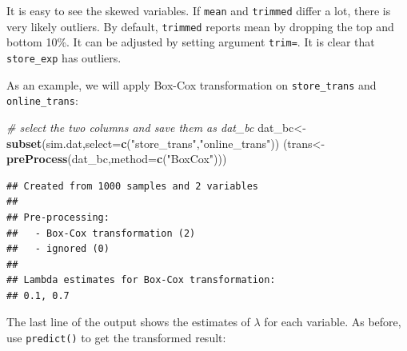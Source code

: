 \documentclass[12pt,]{krantz}
\newenvironment{Shaded}{\begin{snugshade}}{\end{snugshade}}
\newcommand{\KeywordTok}[1]{\textcolor[rgb]{0.13,0.29,0.53}{\textbf{#1}}}
\newcommand{\DataTypeTok}[1]{\textcolor[rgb]{0.13,0.29,0.53}{#1}}
\newcommand{\DecValTok}[1]{\textcolor[rgb]{0.00,0.00,0.81}{#1}}
\newcommand{\StringTok}[1]{\textcolor[rgb]{0.31,0.60,0.02}{#1}}
\newcommand{\CommentTok}[1]{\textcolor[rgb]{0.56,0.35,0.01}{\textit{#1}}}
\newcommand{\OperatorTok}[1]{\textcolor[rgb]{0.81,0.36,0.00}{\textbf{#1}}}
\newcommand{\NormalTok}[1]{#1}
\theoremstyle{definition}
\theoremstyle{definition}
\theoremstyle{definition}
\theoremstyle{remark}
\begin{document}
It is easy to see the skewed variables. If \texttt{mean} and
\texttt{trimmed} differ a lot, there is very likely outliers. By
default, \texttt{trimmed} reports mean by dropping the top and bottom
10\%. It can be adjusted by setting argument \texttt{trim=}. It is clear
that \texttt{store\_exp} has outliers.

As an example, we will apply Box-Cox transformation on
\texttt{store\_trans} and \texttt{online\_trans}:

\begin{Shaded}
\begin{Highlighting}[]
\CommentTok{# select the two columns and save them as dat_bc}
\NormalTok{dat_bc<-}\KeywordTok{subset}\NormalTok{(sim.dat,}\DataTypeTok{select=}\KeywordTok{c}\NormalTok{(}\StringTok{"store_trans"}\NormalTok{,}\StringTok{"online_trans"}\NormalTok{))}
\NormalTok{(trans<-}\KeywordTok{preProcess}\NormalTok{(dat_bc,}\DataTypeTok{method=}\KeywordTok{c}\NormalTok{(}\StringTok{"BoxCox"}\NormalTok{)))}
\end{Highlighting}
\end{Shaded}

\begin{verbatim}
## Created from 1000 samples and 2 variables
## 
## Pre-processing:
##   - Box-Cox transformation (2)
##   - ignored (0)
## 
## Lambda estimates for Box-Cox transformation:
## 0.1, 0.7
\end{verbatim}

The last line of the output shows the estimates of \(\lambda\) for each
variable. As before, use \texttt{predict()} to get the transformed
result:

\begin{Shaded}
\end{Shaded}
\end{document}
